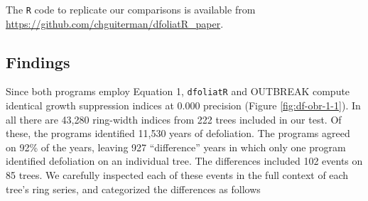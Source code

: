 \documentclass[review]{elsarticle} %
\begin{document}
The \texttt{R} code to replicate our comparisons is available from \url{https://github.com/chguiterman/dfoliatR_paper}.

\hypertarget{findings}{%
\subsection{Findings}\label{findings}}

Since both programs employ Equation 1, \texttt{dfoliatR} and OUTBREAK compute identical growth suppression indices at 0.000 precision (Figure \ref{fig:df-obr-1-1}). In all there are 43,280 ring-width indices from 222 trees included in our test. Of these, the programs identified 11,530 years of defoliation. The programs agreed on 92\% of the years, leaving 927 ``difference'' years in which only one program identified defoliation on an individual tree. The differences included 102 events on 85 trees. We carefully inspected each of these events in the full context of each tree's ring series, and categorized the differences as follows
\end{document}
